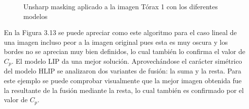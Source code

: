 \begin{figure}
\begin{center}
		\caption{Unsharp masking aplicado a la imagen T\'orax 1 con los diferentes modelos}
	\end{center}
\end{figure}

En la Figura 3.13 se puede apreciar como este algoritmo para el caso lineal de una imagen incluso peor a la imagen original pues esta es muy oscura y los bordes no se aprecian muy bien definidos, lo cual tambi\'en lo confirma el valor de $C_p$. El modelo LIP da una mejor soluci\'on. Aprovech\'andose el car\'acter sim\'etrico del modelo HLIP se analizaron dos variantes de fusi\'on: la suma y la resta. Para este ejemplo se puede comprobar visualmente que la mejor imagen obtenida fue la resultante de la fusi\'on mediante la resta, lo cual tambi\'en es confirmado por el valor de $C_p$. 

